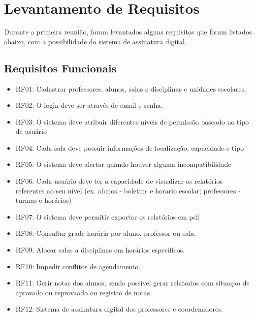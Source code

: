 \documentclass[12pt,a4paper]{report}
\begin{document}
\chapter{Levantamento de Requisitos}
Durante a primeira reunião, foram levantados alguns requisitos que foram listados abaixo, com a possibilidade do sistema de assinatura digital. 
\section{Requisitos Funcionais}
	\begin{itemize}
    \item RF01: Cadastrar professores, alunos, salas e disciplinas e unidades escolares.
    \item RF02: O login deve ser através de email e senha.
    \item RF03: O sistema deve atribuir diferentes níveis de permissão baseado no tipo de usuário
    \item RF04: Cada sala deve possuir informações de localização, capacidade e tipo
    \item RF05: O sistema deve alertar quando houver alguma incompatibilidade
    \item RF06: Cada usuário deve ter a capacidade de visualizar os relatórios referentes ao seu nível (ex. alunos - boletins e horario escolar; professores - turmas e horários)
    \item RF07: O sistema deve permitir exportar os relatórios em pdf
    \item RF08: Consultar grade horária por aluno, professor ou sala.
    \item RF09: Alocar salas a disciplinas em horários específicos.
    \item RF10: Impedir conflitos de agendamento.
    \item RF11: Gerir notas dos alunos, sendo possivel gerar relatorios com situaçao de aprovado ou reprovaado ou registro de notas.
    \item RF12: Sistema de assinatura digital dos professores e coordenadores.
	\end{itemize}
\end{document}
